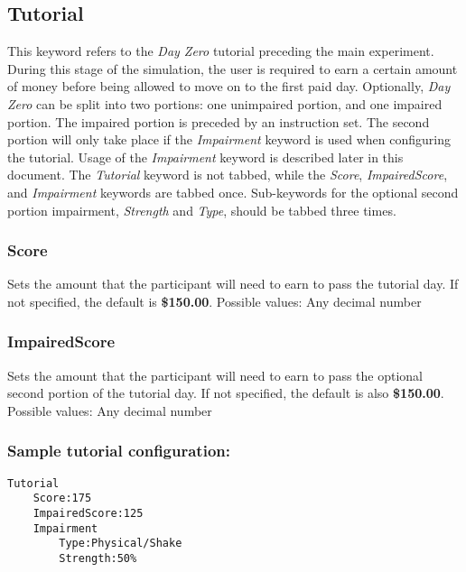 \documentclass{article}
\begin{document}
\subsection{Tutorial}
This keyword refers to the \textit{Day Zero} tutorial preceding the main experiment. During this stage of the simulation, the user is required to earn a certain amount of money before being allowed to move on to the first paid day. Optionally, \textit{Day Zero} can be split into two portions: one unimpaired portion, and one impaired portion. The impaired portion is preceded by an instruction set. The second portion will only take place if the \textit{Impairment} keyword is used when configuring the tutorial. Usage of the \textit{Impairment} keyword is described later in this document. The \textit{Tutorial} keyword is not tabbed, while the \textit{Score}, \textit{ImpairedScore}, and \textit{Impairment} keywords are tabbed once. Sub-keywords for the optional second portion impairment, \textit{Strength} and \textit{Type}, should be tabbed three times.

\subsubsection{Score} Sets the amount that the participant will need to earn to pass the tutorial day. If not specified, the default is \textbf{\$150.00}. \newline
\indent Possible values: \newline
\indent\indent Any decimal number

\subsubsection{ImpairedScore} Sets the amount that the participant will need to earn to pass the optional second portion of the tutorial day. If not specified, the default is also \textbf{\$150.00}. \newline
\indent Possible values: \newline
\indent\indent Any decimal number

\subsubsection{Sample tutorial configuration:}
\begin{lstlisting}
Tutorial
    Score:175
    ImpairedScore:125
    Impairment
        Type:Physical/Shake
        Strength:50%
\end{lstlisting}
\end{document}
